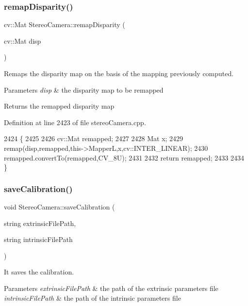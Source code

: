 \subsubsection{\texorpdfstring{remap\+Disparity()}{remapDisparity()}}
{\footnotesize\ttfamily cv\+::\+Mat Stereo\+Camera\+::remap\+Disparity (\begin{DoxyParamCaption}\item[{cv\+::\+Mat}]{disp }\end{DoxyParamCaption})}



Remaps the disparity map on the basis of the mapping previously computed. 


\begin{DoxyParams}{Parameters}
{\em disp} & the disparity map to be remapped \\
\hline
\end{DoxyParams}
\begin{DoxyReturn}{Returns}
the remapped disparity map 
\end{DoxyReturn}


Definition at line 2423 of file stereo\+Camera.\+cpp.


\begin{DoxyCode}
2424 \{
2425 
2426     cv::Mat remapped;
2427 
2428     Mat x;
2429     remap(disp,remapped,this->MapperL,x,cv::INTER\_LINEAR);
2430     remapped.convertTo(remapped,CV\_8U);
2431 
2432     \textcolor{keywordflow}{return} remapped;
2433 
2434 \}
\end{DoxyCode}
\mbox{\label{classStereoCamera_a9f06cd4b170ad0ba45b681ee93d64851}} 
\subsubsection{\texorpdfstring{save\+Calibration()}{saveCalibration()}}
{\footnotesize\ttfamily void Stereo\+Camera\+::save\+Calibration (\begin{DoxyParamCaption}\item[{string}]{extrinsic\+File\+Path,  }\item[{string}]{intrinsic\+File\+Path }\end{DoxyParamCaption})}



It saves the calibration. 


\begin{DoxyParams}{Parameters}
{\em extrinsic\+File\+Path} & the path of the extrinsic parameters file \\
\hline
{\em intrinsic\+File\+Path} & the path of the intrinsic parameters file \\
\hline
\end{DoxyParams}


